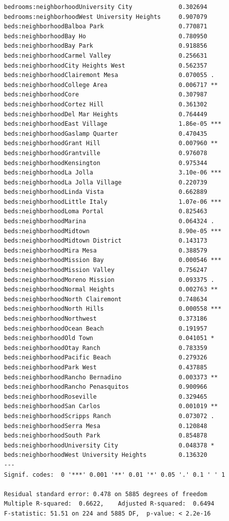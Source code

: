 \documentclass[
  letterpaper,
  DIV=11,
  numbers=noendperiod,
  oneside]{scrreprt}
\begin{document}
\begin{verbatim}
bedrooms:neighborhoodUniversity City             0.302694    
bedrooms:neighborhoodWest University Heights     0.907079    
beds:neighborhoodBalboa Park                     0.770871    
beds:neighborhoodBay Ho                          0.780950    
beds:neighborhoodBay Park                        0.918856    
beds:neighborhoodCarmel Valley                   0.256631    
beds:neighborhoodCity Heights West               0.562357    
beds:neighborhoodClairemont Mesa                 0.070055 .  
beds:neighborhoodCollege Area                    0.006717 ** 
beds:neighborhoodCore                            0.307987    
beds:neighborhoodCortez Hill                     0.361302    
beds:neighborhoodDel Mar Heights                 0.764449    
beds:neighborhoodEast Village                    1.86e-05 ***
beds:neighborhoodGaslamp Quarter                 0.470435    
beds:neighborhoodGrant Hill                      0.007960 ** 
beds:neighborhoodGrantville                      0.976078    
beds:neighborhoodKensington                      0.975344    
beds:neighborhoodLa Jolla                        3.10e-06 ***
beds:neighborhoodLa Jolla Village                0.220739    
beds:neighborhoodLinda Vista                     0.662889    
beds:neighborhoodLittle Italy                    1.07e-06 ***
beds:neighborhoodLoma Portal                     0.825463    
beds:neighborhoodMarina                          0.064324 .  
beds:neighborhoodMidtown                         8.90e-05 ***
beds:neighborhoodMidtown District                0.143173    
beds:neighborhoodMira Mesa                       0.388579    
beds:neighborhoodMission Bay                     0.000546 ***
beds:neighborhoodMission Valley                  0.756247    
beds:neighborhoodMoreno Mission                  0.093375 .  
beds:neighborhoodNormal Heights                  0.002763 ** 
beds:neighborhoodNorth Clairemont                0.748634    
beds:neighborhoodNorth Hills                     0.000558 ***
beds:neighborhoodNorthwest                       0.373186    
beds:neighborhoodOcean Beach                     0.191957    
beds:neighborhoodOld Town                        0.041051 *  
beds:neighborhoodOtay Ranch                      0.783359    
beds:neighborhoodPacific Beach                   0.279326    
beds:neighborhoodPark West                       0.437885    
beds:neighborhoodRancho Bernadino                0.003373 ** 
beds:neighborhoodRancho Penasquitos              0.900966    
beds:neighborhoodRoseville                       0.329465    
beds:neighborhoodSan Carlos                      0.001019 ** 
beds:neighborhoodScripps Ranch                   0.073072 .  
beds:neighborhoodSerra Mesa                      0.120848    
beds:neighborhoodSouth Park                      0.854878    
beds:neighborhoodUniversity City                 0.048378 *  
beds:neighborhoodWest University Heights         0.136320    
---
Signif. codes:  0 '***' 0.001 '**' 0.01 '*' 0.05 '.' 0.1 ' ' 1

Residual standard error: 0.478 on 5885 degrees of freedom
Multiple R-squared:  0.6622,    Adjusted R-squared:  0.6494 
F-statistic: 51.51 on 224 and 5885 DF,  p-value: < 2.2e-16
\end{verbatim}
\end{document}
